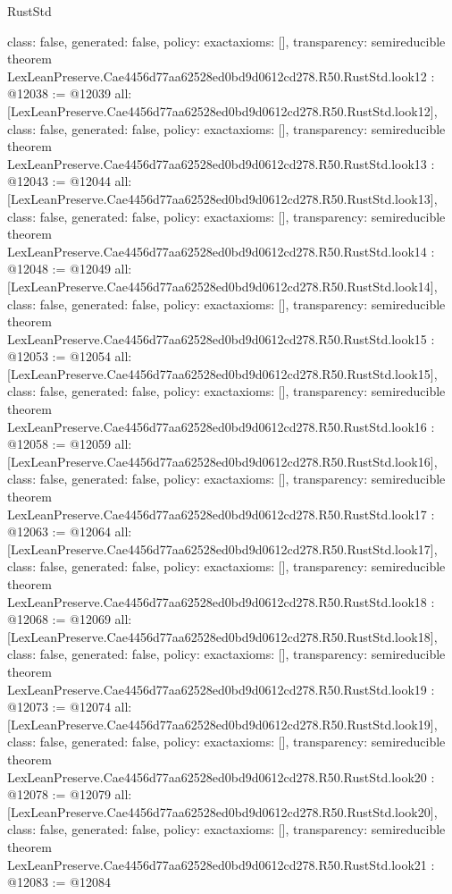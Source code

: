 \begin{lexlean}{RustStd}
\begin{coremodule}
{  class: false,
  generated: false,
  policy: exact{axioms: []},
  transparency: semireducible
}
theorem LexLeanPreserve.Cae4456d77aa62528ed0bd9d0612cd278.R50.RustStd.look12 : @12038 := @12039 {
  all: [LexLeanPreserve.Cae4456d77aa62528ed0bd9d0612cd278.R50.RustStd.look12],
  class: false,
  generated: false,
  policy: exact{axioms: []},
  transparency: semireducible
}
theorem LexLeanPreserve.Cae4456d77aa62528ed0bd9d0612cd278.R50.RustStd.look13 : @12043 := @12044 {
  all: [LexLeanPreserve.Cae4456d77aa62528ed0bd9d0612cd278.R50.RustStd.look13],
  class: false,
  generated: false,
  policy: exact{axioms: []},
  transparency: semireducible
}
theorem LexLeanPreserve.Cae4456d77aa62528ed0bd9d0612cd278.R50.RustStd.look14 : @12048 := @12049 {
  all: [LexLeanPreserve.Cae4456d77aa62528ed0bd9d0612cd278.R50.RustStd.look14],
  class: false,
  generated: false,
  policy: exact{axioms: []},
  transparency: semireducible
}
theorem LexLeanPreserve.Cae4456d77aa62528ed0bd9d0612cd278.R50.RustStd.look15 : @12053 := @12054 {
  all: [LexLeanPreserve.Cae4456d77aa62528ed0bd9d0612cd278.R50.RustStd.look15],
  class: false,
  generated: false,
  policy: exact{axioms: []},
  transparency: semireducible
}
theorem LexLeanPreserve.Cae4456d77aa62528ed0bd9d0612cd278.R50.RustStd.look16 : @12058 := @12059 {
  all: [LexLeanPreserve.Cae4456d77aa62528ed0bd9d0612cd278.R50.RustStd.look16],
  class: false,
  generated: false,
  policy: exact{axioms: []},
  transparency: semireducible
}
theorem LexLeanPreserve.Cae4456d77aa62528ed0bd9d0612cd278.R50.RustStd.look17 : @12063 := @12064 {
  all: [LexLeanPreserve.Cae4456d77aa62528ed0bd9d0612cd278.R50.RustStd.look17],
  class: false,
  generated: false,
  policy: exact{axioms: []},
  transparency: semireducible
}
theorem LexLeanPreserve.Cae4456d77aa62528ed0bd9d0612cd278.R50.RustStd.look18 : @12068 := @12069 {
  all: [LexLeanPreserve.Cae4456d77aa62528ed0bd9d0612cd278.R50.RustStd.look18],
  class: false,
  generated: false,
  policy: exact{axioms: []},
  transparency: semireducible
}
theorem LexLeanPreserve.Cae4456d77aa62528ed0bd9d0612cd278.R50.RustStd.look19 : @12073 := @12074 {
  all: [LexLeanPreserve.Cae4456d77aa62528ed0bd9d0612cd278.R50.RustStd.look19],
  class: false,
  generated: false,
  policy: exact{axioms: []},
  transparency: semireducible
}
theorem LexLeanPreserve.Cae4456d77aa62528ed0bd9d0612cd278.R50.RustStd.look20 : @12078 := @12079 {
  all: [LexLeanPreserve.Cae4456d77aa62528ed0bd9d0612cd278.R50.RustStd.look20],
  class: false,
  generated: false,
  policy: exact{axioms: []},
  transparency: semireducible
}
theorem LexLeanPreserve.Cae4456d77aa62528ed0bd9d0612cd278.R50.RustStd.look21 : @12083 := @12084 {
}
\end{coremodule}
\end{lexlean}
